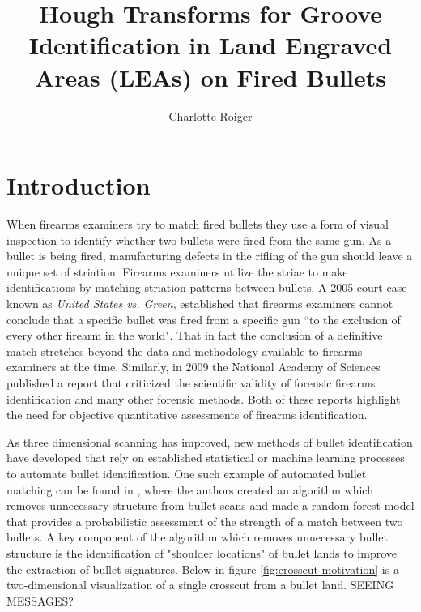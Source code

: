 \documentclass[12pt]{article}\usepackage[]{graphicx}\usepackage[]{color}
\author{Charlotte Roiger}
\title{Hough Transforms for Groove Identification in Land Engraved Areas (LEAs) on Fired Bullets}
\theoremstyle{nonumberplain}
\begin{document}
\lhead{\today}

\section{Introduction}

When firearms examiners try to match fired bullets they use a form of visual inspection to identify whether two bullets were fired from the same gun. As a bullet is being fired, manufacturing defects in the rifling of the gun should leave a unique set of striation. Firearms examiners utilize the striae to make identifications by matching striation patterns between bullets. A 2005 court case known as \textit{United States vs. Green}, established that firearms examiners cannot conclude that a specific bullet was fired from a specific gun ``to the exclusion of every other firearm in the world". That in fact the conclusion of a definitive match stretches beyond the data and methodology available to firearms examiners at the time.  Similarly, in 2009 the National Academy of Sciences published a report that criticized the scientific validity of forensic firearms identification and many other forensic methods. Both of these reports highlight the need for objective quantitative assessments of firearms identification. 

As three dimensional scanning has improved, new methods of bullet identification have developed that rely on established statistical or machine learning processes to automate bullet identification. One such example of automated bullet matching can be found in \cite{hare2017}, where the authors created an algorithm which removes unnecessary structure from bullet scans and made a random forest model that provides a probabilistic assessment of the strength of a match between two bullets. A key component of the algorithm which removes unnecessary bullet structure is the identification of "shoulder locations" of bullet lands to improve the extraction of bullet signatures. Below in figure \ref{fig:crosscut-motivation} is a two-dimensional visualization of a single crosscut from a bullet land.  SEEING MESSAGES?
\end{document}
